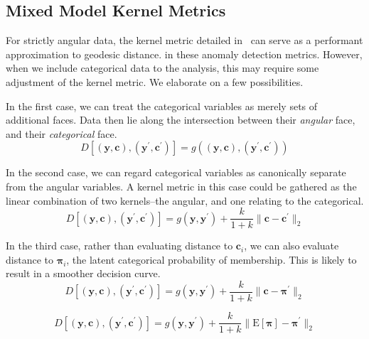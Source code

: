 \subsection{Mixed Model Kernel Metrics}
For strictly angular data, the kernel metric detailed in~\cite{trubey:pg} can 
  serve as a performant approximation to geodesic distance. in these 
  anomaly detection metrics.  However, when we include categorical data to the 
  analysis, this may require some adjustment of the kernel metric.  We elaborate 
  on a few possibilities.

In the first case, we can treat the categorical variables as merely sets of 
  additional faces.  Data then lie along the intersection between their 
  \emph{angular} face, and their \emph{categorical} face.
  \begin{equation}
    D\left[(\bm{y},\bm{c}), (\bm{y}^{\prime}, \bm{c}^{\prime})\right] = 
        g\left((\bm{y},\bm{c}), (\bm{y}^{\prime}, \bm{c}^{\prime})\right)
  \end{equation}

In the second case, we can regard categorical variables as canonically separate 
  from the angular variables. A kernel metric in this case could be gathered as 
  the linear combination of two kernels--the angular, and one relating to the 
  categorical.  
  \begin{equation*}
    D\left[(\bm{y},\bm{c}), (\bm{y}^{\prime}, \bm{c}^{\prime})\right] = 
      g(\bm{y},\bm{y}^{\prime}) + 
          \frac{k}{1 + k}\lVert \bm{c} - \bm{c}^{\prime}\rVert_2
  \end{equation*}
    
In the third case, rather than evaluating distance to $\bm{c}_i$, we can also 
  evaluate distance to $\bm{\pi}_i$, the latent categorical probability of 
  membership.  This is likely to result in a smoother decision curve.
  \begin{equation*}
    D\left[(\bm{y},\bm{c}), (\bm{y}^{\prime}, \bm{c}^{\prime})\right] = 
      g(\bm{y},\bm{y}^{\prime}) + 
          \frac{k}{1 + k}\lVert \bm{c} - \bm{\pi}^{\prime}\rVert_2
  \end{equation*}

  \[
    D\left[(\bm{y},\bm{c}), (\bm{y}^{\prime}, \bm{c}^{\prime})\right] = 
      g(\bm{y},\bm{y}^{\prime}) + 
          \frac{k}{1 + k}\lVert \text{E}[\bm{\pi}] - \bm{\pi}^{\prime}\rVert_2
  \]

